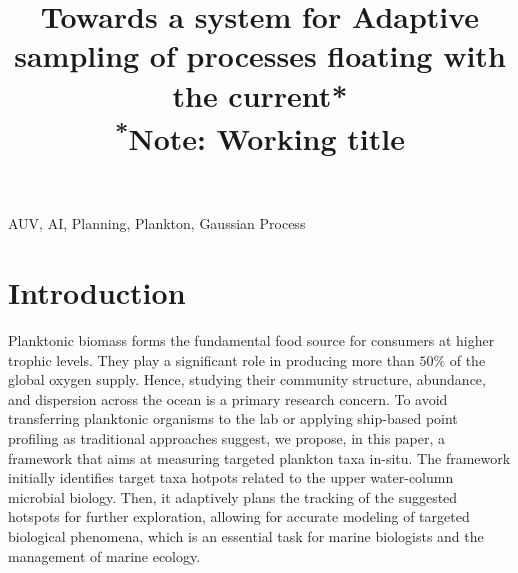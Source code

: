 \documentclass[conference]{IEEEtran}
\begin{document}
\title{Towards a system for Adaptive sampling of processes floating with the current*\\
{\footnotesize \textsuperscript{*}Note: Working title}
}

\author{
}
\maketitle

\begin{abstract}

\end{abstract}

\begin{IEEEkeywords}
AUV, AI, Planning, Plankton, Gaussian Process
\end{IEEEkeywords}

\section{Introduction}
Planktonic biomass forms the fundamental food source for consumers at higher trophic levels. They play a significant role in producing more than $50\%$ of the global oxygen supply. Hence, studying their community structure, abundance, and dispersion across the ocean is a primary research concern. To avoid transferring planktonic organisms to the lab or applying ship-based point profiling as traditional approaches suggest, we propose, in this paper, a framework that aims at measuring targeted plankton taxa in-situ. 
The framework initially identifies target taxa hotpots related to the upper water-column microbial biology. Then, it adaptively plans the tracking of the suggested hotspots for further exploration, allowing for accurate modeling of targeted biological phenomena, which is an essential task for marine biologists and the management of marine ecology.
\end{document}
